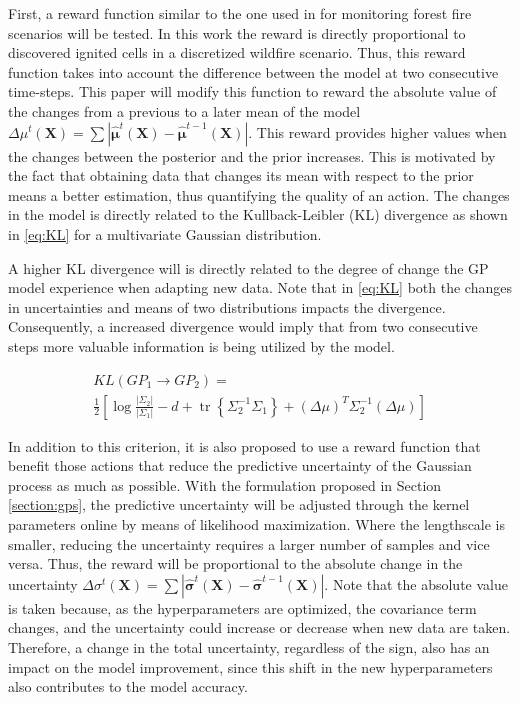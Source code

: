 \documentclass[journal]{IEEEtran}
\newcommand\vect[1]{\boldsymbol{#1}}
\begin{document}
First, a reward function similar to the one used in \cite{wildfires} for monitoring forest fire scenarios will be tested. In this work the reward is directly proportional to discovered ignited cells in a discretized wildfire scenario. Thus, this reward function takes into account the difference between the model at two consecutive time-steps. 
This paper will modify this function to reward the absolute value of the changes from a previous to a later mean of the model $\Delta \mu^t(\vect{X}) = \sum |\vect{\hat \mu}^t (\vect{X})- \vect{\hat \mu}^{t-1}(\vect{X})|$. This reward provides higher values when the changes between the posterior and the prior increases. This is motivated by the fact that obtaining data that changes its mean with respect to the prior means a better estimation, thus quantifying the quality of an action. The changes in the model is directly related to the Kullback-Leibler (KL) divergence as shown in \eqref{eq:KL} for a multivariate Gaussian distribution. 

A higher KL divergence will is directly related to the degree of change the GP model experience when adapting new data. 
Note that in \eqref{eq:KL} both the changes in uncertainties and means of two distributions impacts the divergence. 
Consequently, a increased divergence would imply that from two consecutive steps more valuable information is being utilized by the model.

\begin{equation}
\begin{aligned}
    KL(GP_1 \rightarrow GP_2) = \\
    \frac{1}{2}\left[\log \frac{\left|\Sigma_2\right|}{\left|\Sigma_1\right|}-d+\operatorname{tr}\left\{\Sigma_2^{-1} \Sigma_1\right\}+\left(\Delta \mu\right)^T \Sigma_2^{-1}\left(\Delta \mu \right)\right]
\end{aligned}
\label{eq:KL}
\end{equation}



In addition to this criterion, it is also proposed to use a reward function that benefit those actions that reduce the predictive uncertainty of the Gaussian process as much as possible. With the formulation proposed in Section \ref{section:gps}, the predictive uncertainty will be adjusted through the kernel parameters online by means of likelihood maximization. Where the lengthscale is smaller, reducing the uncertainty requires a larger number of samples and vice versa. Thus, the reward will be proportional to the absolute change in the uncertainty $\Delta \sigma^t(\vect{X}) = \sum |\vect{\hat \sigma}^t (\vect{X})- \vect{\hat \sigma}^{t-1}(\vect{X})|$. 
Note that the absolute value is taken because, as the hyperparameters are optimized, the covariance term changes, and the uncertainty could increase or decrease when new data are taken. Therefore, a change in the total uncertainty, regardless of the sign, also has an impact on the model improvement, since this shift in the new hyperparameters also contributes to the model accuracy.
\end{document}
